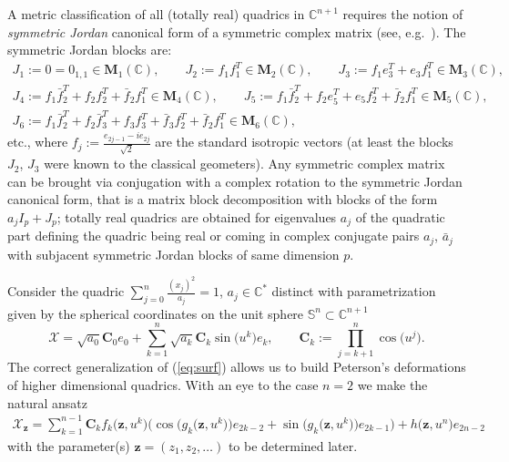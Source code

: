 \begin{remark}
A metric classif\/ication of all (totally real) quadrics in
$\mathbb{C}^{n+1}$ requires the notion of {\it symmetric Jordan}
canonical form of a symmetric complex matrix (see, e.g.~\cite{H}). The symmetric Jordan blocks are:
\begin{gather*}
J_1:=0=0_{1,1}\in\mathbf{M}_1(\mathbb{C}),\qquad
J_2:=f_1f_1^T\in\mathbf{M}_2(\mathbb{C}),\qquad
J_3:=f_1e_3^T+e_3f_1^T\in\mathbf{M}_3(\mathbb{C}),
\\
J_4:=f_1\bar f_2^T+f_2f_2^T+\bar
f_2f_1^T\in\mathbf{M}_4(\mathbb{C}),\qquad J_5:= f_1\bar
f_2^T+f_2e_5^T+e_5f_2^T+\bar
f_2f_1^T\in\mathbf{M}_5(\mathbb{C}),
\\
J_6:= f_1\bar f_2^T+f_2\bar f_3^T+f_3f_3^T+\bar f_3f_2^T+\bar
f_2f_1^T\in\mathbf{M}_6(\mathbb{C}),
\end{gather*}
etc., where $f_j:=\frac{e_{2j-1}-ie_{2j}}{\sqrt{2}}$ are the
standard isotropic vectors (at least the blocks $J_2$, $J_3$ were
known to the classical geometers). Any symmetric complex matrix
can be brought via conjugation with a complex rotation to the
symmetric Jordan canonical form, that is a matrix block
decomposition with blocks of the form $a_jI_p+J_p$; totally real
quadrics are obtained for eigenvalues $a_j$ of the quadratic part
def\/ining the quadric being real or coming in complex conjugate
pairs $a_j$, $\bar a_j$ with subjacent symmetric Jordan blocks of
same dimension $p$.
\end{remark}

Consider the quadric $\sum\limits_{j=0}^n\frac{(x_j)^2}{a_j}=1$, $
a_j\in\mathbb{C}^*$ distinct with parametrization given by the
spherical coordinates on the unit sphere
$\mathbb{S}^n\subset\mathbb{C}^{n+1}$
\[
\mathcal{X}=\sqrt{a_0}\mathbf{C}_0e_0+
\sum_{k=1}^n\sqrt{a_k}\mathbf{C}_k\sin\big(u^k\big)e_k,\qquad
\mathbf{C}_k:=\prod_{j=k+1}^n\cos\big(u^j\big).
\]
The correct generalization of (\ref{eq:surf}) allows us to build
Peterson's deformations of higher dimensional quadrics. With an
eye to the case $n=2$ we make the natural ansatz
\begin{gather}
\mathcal{X}_{\mathbf{z}}=\sum_{k=1}^{n-1}\mathbf{C}_kf_k\big(\mathbf{z},u^k\big)
\big(\cos\big(g_k\big(\mathbf{z},u^k\big)\big)e_{2k-2}
+\sin\big(g_k\big(\mathbf{z},u^k\big)\big)e_{2k-1}\big)+h\big(\mathbf{z},u^n\big)e_{2n-2}\label{eq:surf3}
\end{gather}
with the parameter(s) $\mathbf{z}=(z_1,z_2,\dots )$ to be determined
later.

